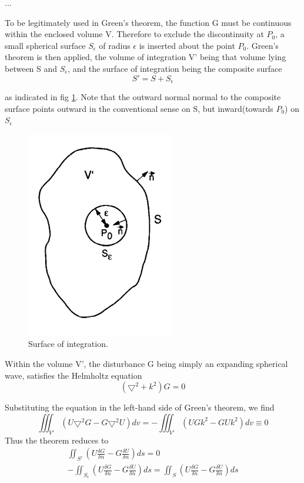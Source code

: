 \documentclass[../main.tex]{subfiles}
\begin{document}
	...

	To be legitimately used in Green's theorem, the function G must be continuous within the enclosed volume V. Therefore to exclude the discontinuity at $P_0$, a small spherical surface $S_\epsilon$ of radius $\epsilon$ is inserted about the point $P_0$. Green's theorem is then applied, the volume of integration V' being that volume lying between S and $S_\epsilon$, and the surface of integration being the composite surface
	\begin{equation}
	S'=S+S_\epsilon
	\end{equation}

	as indicated in fig \ref{fig:integration}. Note that the outward normal normal to the composite surface points outward in the conventional sense on S, but inward(towards $P_0$) on $S_\epsilon$

	\begin{figure}[h!]
	  \centering
	  \includegraphics[scale=0.5]{../graphics/Wave_optics3.png}
	  \caption{Surface of integration.}
	  \label{fig:integration}
	\end{figure}

	Within the volume V', the disturbance G being simply an expanding spherical wave, satisfies the Helmholtz equation
	\begin{equation}
	(\boldsymbol{\bigtriangledown}^2+k^2)G=0
	\label{eq3-1}
	\end{equation}

	Substituting the equation in the left-hand side of Green's theorem, we find
	\begin{equation}
	\iiint_{V'} (U\boldsymbol{\bigtriangledown}^2G-G\boldsymbol{\bigtriangledown}^2U)dv=-\iiint_{V'} (UGk^2-GUk^2)dv\equiv0
	\end{equation}
	Thus the theorem reduces to 
	\begin{align}
	\iint_{S'} (U\frac{\delta G}{\delta n}-G\frac{\delta U}{\delta n})ds=0\\
	-\iint_{S_\epsilon} (U\frac{\delta G}{\delta n}-G\frac{\delta U}{\delta n})ds=\iint_{S} (U\frac{\delta G}{\delta n}-G\frac{\delta U}{\delta n})ds
	\end{align}
\end{document}
